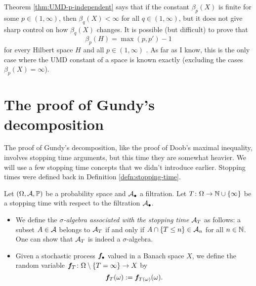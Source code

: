 \begin{rmk}
  Theorem \ref{thm:UMD-p-independent} says that if the constant $\beta_{p}(X)$ is finite for some $p \in (1,\infty)$, then $\beta_{q}(X) < \infty$ for all $q \in (1,\infty)$, but it does not give sharp control on how $\beta_{q}(X)$ changes.
  It is possible (but difficult) to prove that
  \begin{equation*}
    \beta_{p}(H) = \max(p,p') - 1
  \end{equation*}
  for every Hilbert space $H$ and all $p \in (1,\infty)$ \cite[Corollary 4.5.15]{HNVW16}.
  As far as I know, this is the only case where the UMD constant of a space is known exactly (excluding the cases $\beta_{p}(X) = \infty$).
\end{rmk}


\section{The proof of Gundy's decomposition}

The proof of Gundy's decomposition, like the proof of Doob's maximal inequality, involves stopping time arguments, but this time they are somewhat heavier.
We will use a few stopping time concepts that we didn't introduce earlier.
Stopping times were defined back in Definition \ref{defn:stopping-time}.

\begin{defn}
  Let $(\Omega,\mathcal{A},\mathbb{P})$ be a probability space and $\mathcal{A}_{\bullet}$ a filtration.
  Let $T \colon \Omega \rightarrow \mathbb{N} \cup \{\infty\}$ be a stopping time with respect to the filtration $\mathcal{A}_{\bullet}$.

  \begin{itemize}
  \item We define the \emph{$\sigma$-algebra associated with the stopping time} $\mathcal{A}_{T}$ as follows: a subset $A \in \mathcal{A}$ belongs to $\mathcal{A}_{T}$ if and only if $A \cap \{T \leq n\} \in \mathcal{A}_{n}$ for all $n \in \mathbb{N}$.
    One can show that $\mathcal{A}_{T}$ is indeed a $\sigma$-algebra.
  \item Given a stochastic process $\bm{f}_{\bullet}$ valued in a Banach space $X$, we define the random variable $\bm{f}_{T} \colon \Omega \setminus \{T = \infty\} \to X$ by
    \begin{equation*}
      \bm{f}_{T}(\omega) := \bm{f}_{T(\omega)}(\omega).
    \end{equation*}
  \end{itemize}
\end{defn}

